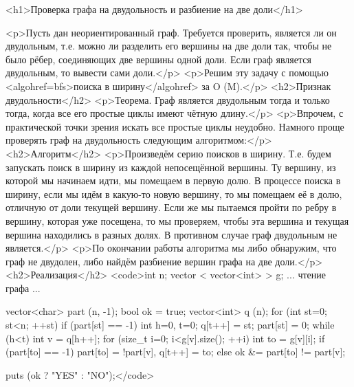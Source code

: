 <h1>Проверка графа на двудольность и разбиение на две доли</h1>

<p>Пусть дан неориентированный граф. Требуется проверить, является ли он двудольным, т.е. можно ли разделить его вершины на две доли так, чтобы не было рёбер, соединяющих две вершины одной доли. Если граф является двудольным, то вывести сами доли.</p>
<p>Решим эту задачу с помощью <algohref=bfs>поиска в ширину</algohref> за O (M).</p>
<h2>Признак двудольности</h2>
<p>Теорема. Граф является двудольным тогда и только тогда, когда все его простые циклы имеют чётную длину.</p>
<p>Впрочем, с практической точки зрения искать все простые циклы неудобно. Намного проще проверять граф на двудольность следующим алгоритмом:</p>
<h2>Алгоритм</h2>
<p>Произведём серию поисков в ширину. Т.е. будем запускать поиск в ширину из каждой непосещённой вершины. Ту вершину, из которой мы начинаем идти, мы помещаем в первую долю. В процессе поиска в ширину, если мы идём в какую-то новую вершину, то мы помещаем её в долю, отличную от доли текущей вершину. Если же мы пытаемся пройти по ребру в вершину, которая уже посещена, то мы проверяем, чтобы эта вершина и текущая вершина находились в разных долях. В противном случае граф двудольным не является.</p>
<p>По окончании работы алгоритма мы либо обнаружим, что граф не двудолен, либо найдём разбиение вершин графа на две доли.</p>
<h2>Реализация</h2>
<code>int n;
vector < vector<int> > g;
... чтение графа ...

vector<char> part (n, -1);
bool ok = true;
vector<int> q (n);
for (int st=0; st<n; ++st)
	if (part[st] == -1) {
		int h=0, t=0;
		q[t++] = st;
		part[st] = 0;
		while (h<t) {
			int v = q[h++];
			for (size_t i=0; i<g[v].size(); ++i) {
				int to = g[v][i];
				if (part[to] == -1)
					part[to] = !part[v],  q[t++] = to;
				else
					ok &= part[to] != part[v];
			}
		}
	}

puts (ok ? "YES" : "NO");</code>